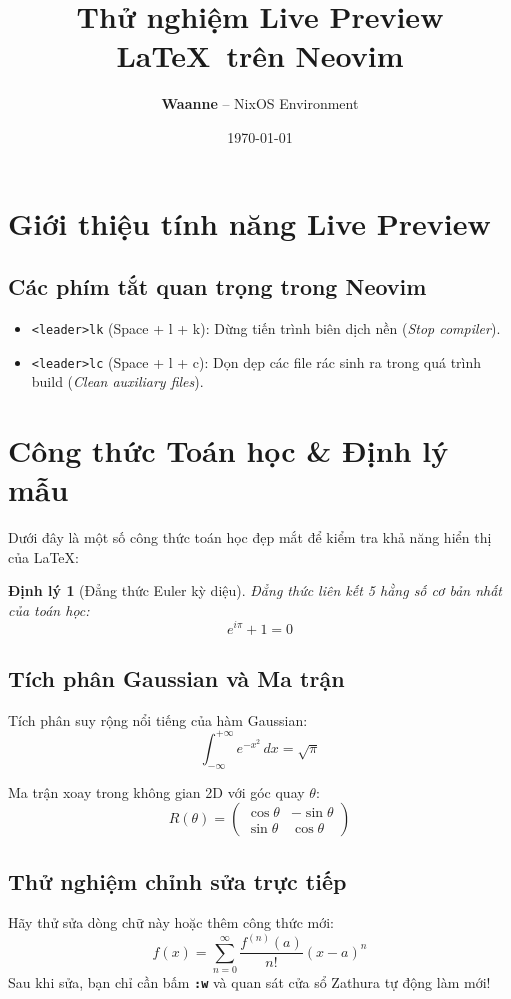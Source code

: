 \documentclass[12pt,a4paper]{article}
\title{\textbf{\Huge Thử nghiệm Live Preview \LaTeX\ trên Neovim}}
\author{\textbf{Waanne} -- NixOS Environment}
\date{\today}
\newtheorem{theorem}{Định lý}
\begin{document}
\maketitle

\section{Giới thiệu tính năng Live Preview}
\subsection{Các phím tắt quan trọng trong Neovim}
\begin{itemize}
	\item \texttt{<leader>lk} (Space + l + k): Dừng tiến trình biên dịch nền (\textit{Stop compiler}).
	\item \texttt{<leader>lc} (Space + l + c): Dọn dẹp các file rác sinh ra trong quá trình build (\textit{Clean auxiliary files}).
\end{itemize}

\section{Công thức Toán học \& Định lý mẫu}

Dưới đây là một số công thức toán học đẹp mắt để kiểm tra khả năng hiển thị của \LaTeX:

\begin{theorem}[Đẳng thức Euler kỳ diệu]
	Đẳng thức liên kết 5 hằng số cơ bản nhất của toán học:
	\begin{equation}
		e^{i\pi} + 1 = 0
	\end{equation}
\end{theorem}

\subsection{Tích phân Gaussian và Ma trận}
Tích phân suy rộng nổi tiếng của hàm Gaussian:
\begin{equation}
	\int_{-\infty}^{+\infty} e^{-x^2} \, dx = \sqrt{\pi}
\end{equation}

Ma trận xoay trong không gian 2D với góc quay $\theta$:
\begin{equation}
	R(\theta) = \begin{pmatrix}
		\cos\theta & -\sin\theta \\
		\sin\theta & \cos\theta
	\end{pmatrix}
\end{equation}

\subsection{Thử nghiệm chỉnh sửa trực tiếp}
Hãy thử sửa dòng chữ này hoặc thêm công thức mới:
\begin{equation}
	f(x) = \sum_{n=0}^{\infty} \frac{f^{(n)}(a)}{n!} (x - a)^n
\end{equation}
Sau khi sửa, bạn chỉ cần bấm \textbf{\texttt{:w}} và quan sát cửa sổ Zathura tự động làm mới!
\end{document}
